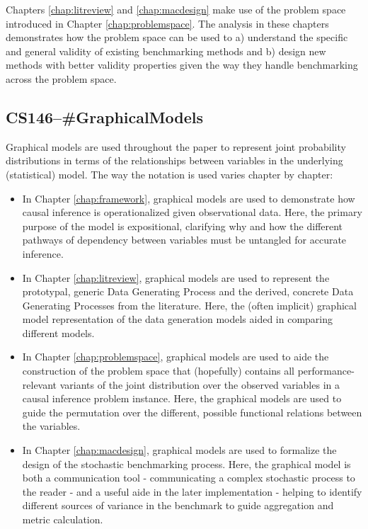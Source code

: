 \documentclass[../main.tex]{subfiles}
\begin{document}
\vspace{\baselineskip}

Chapters \ref{chap:litreview} and \ref{chap:macdesign} make use of the problem space introduced in Chapter \ref{chap:problemspace}. The analysis in these chapters demonstrates how the problem space can be used to a) understand the specific and general validity of existing benchmarking methods and b) design new methods with better validity properties given the way they handle benchmarking across the problem space.


\subsection*{\textbf{CS146--\#GraphicalModels}}
\label{lo:GraphicalModels}

Graphical models are used throughout the paper to represent joint probability distributions in terms of the relationships between variables in the underlying (statistical) model. The way the notation is used varies chapter by chapter:

\begin{itemize}
    \item In Chapter \ref{chap:framework}, graphical models are used to demonstrate how causal inference is operationalized given observational data. Here, the primary purpose of the model is expositional, clarifying why and how the different pathways of dependency between variables must be untangled for accurate inference.
    
    \item In Chapter \ref{chap:litreview}, graphical models are used to represent the prototypal, generic Data Generating Process and the derived, concrete Data Generating Processes from the literature. Here, the (often implicit) graphical model representation of the data generation models aided in comparing different models.
    
    \item In Chapter \ref{chap:problemspace}, graphical models are used to aide the construction of the problem space that (hopefully) contains all performance-relevant variants of the joint distribution over the observed variables in a causal inference problem instance. Here, the graphical models are used to guide the permutation over the different, possible functional relations between the variables.
    
    \item In Chapter \ref{chap:macdesign}, graphical models are used to formalize the design of the stochastic benchmarking process. Here, the graphical model is both a communication tool - communicating a complex stochastic process to the reader - and a useful aide in the later implementation - helping to identify different sources of variance in the benchmark to guide aggregation and metric calculation.
\end{itemize}
\end{document}
